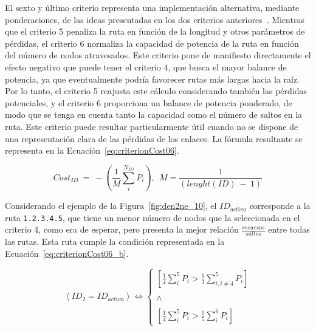 El sexto y último criterio representa una implementación alternativa, mediante ponderaciones, de las ideas presentadas en los dos criterios anteriores~\cite{Schneider17,Ma97}. Mientras que el criterio 5 penaliza la ruta en función de la longitud y otros parámetros de pérdidas, el criterio 6 normaliza la capacidad de potencia de la ruta en función del número de nodos atravesados. Este criterio pone de manifiesto directamente el efecto negativo que puede tener el criterio 4, que busca el mayor balance de potencia, ya que eventualmente podría favorecer rutas más largas hacia la raíz. Por lo tanto, el criterio 5 reajusta este cálculo considerando también las pérdidas potenciales, y el criterio 6 proporciona un balance de potencia ponderado, de modo que se tenga en cuenta tanto la capacidad como el número de saltos en la ruta. Este criterio puede resultar particularmente útil cuando no se dispone de una representación clara de las pérdidas de los enlaces. La fórmula resultante se representa en la Ecuación~\ref{eq:criterionCost06}.  
 

\begin{equation}\label{eq:criterionCost06}
      Cost_{ID}  \: = \: -(\frac{1}{M}\sum_{i}^{N_{ID}} P_{i}), \: \: M = \frac{1}{(lenght(ID) \: - \: 1)}
\end{equation}
\vspace{0.2cm}

Considerando el ejemplo de la Figura~\ref{fig:den2ne_10}, el $ID_{activa}$ corresponde a la ruta \texttt{1.2.3.4.5}, que tiene un menor número de nodos que la seleccionada en el criterio 4, como era de esperar, pero presenta la mejor relación $\frac{recursos}{saltos}$ entre todas las rutas. Esta ruta cumple la condición representada en la Ecuación~\ref{eq:criterionCost06_b}.

\begin{equation}\label{eq:criterionCost06_b}
           \left \langle ID_{2} = ID_{activa} \right \rangle \Leftrightarrow  
           \left\{\begin{matrix}
           [\frac{1}{4}\sum_{i}^{5} P_{i} > \frac{1}{3}\sum_{i,i\neq4}^{5} P_{i}] \\
       \\
       \wedge \\ 
       \\ [\frac{1}{4}\sum_{i}^{5} P_{i} > \frac{1}{5}\sum_{i}^{6} P_{i}]
           \end{matrix}\right.
\end{equation}
\vspace{0.2cm}

